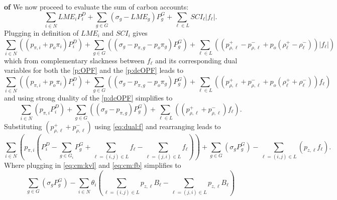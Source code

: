 \documentclass[10pt,a4paper]{amsart}
\renewenvironment{proof}[1]{\par\medskip\noindent\textbf{#1}\enspace\ignorespaces}{\par\medskip}
\begin{document}
\begin{proof}{of }
    We now proceed to evaluate the sum of carbon accounts:
    \begin{equation}
        \sum_{i \in N}LME_i P^D_i + \sum_{g \in G}(\sigma_g - LME_g) P^G_g + \sum_{\ell \in L} SCI_\ell |f_\ell|.
    \end{equation}
    Plugging in definition of $LME_i$ and $SCI_i$ gives
    \begin{equation}
        \sum_{i \in N}\left((p_{\pi,i}+p_o\pi_i) P^D_i\right) + \sum_{g \in G}\left((\sigma_g - p_{\pi,g}-p_o\pi_g) P^G_g\right) + \sum_{\ell \in L} \left( (p^+_{\rho,\ell}-p^-_{\rho,\ell}+p_o(\rho_\ell^+-\rho_\ell^-))|f_\ell|\right) 
    \end{equation}
    which from complementary slackness between $f_\ell$ and its corresponding dual variables for both the \ref{p:OPF} and the \ref{p:dcOPF} leads to
    \begin{equation}
        \sum_{i \in N}\left((p_{\pi,i}+p_o\pi_i) P^D_i\right) + \sum_{g \in G}\left((\sigma_g - p_{\pi,g}-p_o\pi_g) P^G_g\right) + \sum_{\ell \in L} \left( (p^+_{\rho,\ell}+p^-_{\rho,\ell}+p_o(\rho_\ell^++\rho_\ell^-))f_\ell \right) 
    \end{equation}
    and using strong duality of the \ref{p:dcOPF} simplifies to
    \begin{equation}
       \sum_{i \in N}\left(p_{\pi,i} P^D_i\right) + \sum_{g \in G}\left((\sigma_g - p_{\pi,g}) P^G_g\right) + \sum_{\ell \in L} \left( (p^+_{\rho,\ell}+p^-_{\rho,\ell})f_\ell \right). 
    \end{equation}
    Substituting $(p^+_{\rho,\ell}+p^-_{\rho,\ell})$ using \eqref{eq:dual:f} and rearranging leads to
    \begin{equation}
        \sum_{i \in N}\left(p_{\pi,i} (P^D_i-\sum_{g \in G_i}P^G_g+\sum_{\ell=(i,j)\in L}f_\ell-\sum_{\ell=(j,i)\in L}f_\ell)\right) + \sum_{g \in G}\left(\sigma_g P^G_g\right) - \sum_{\ell=(i,j) \in L} \left(p_{z,\ell}f_\ell \right).
    \end{equation}
    Where plugging in \eqref{eq:cm:kvl} and \eqref{eq:cm:fb} simplifies to
    \begin{equation}
        \sum_{g \in G}\left(\sigma_g P^G_g\right) - \sum_{i\in N}\theta_i \left(\sum_{\ell=(i,j)\in L}p_{z,\ell} B_{\ell}-\sum_{\ell=(j,i)\in L}p_{z,\ell}B_{\ell} \right)
    \end{equation}

\end{proof}
\end{document}
